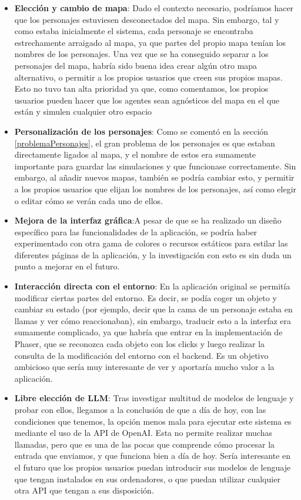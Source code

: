 \begin{itemize}
	\item \textbf{Elección y cambio de mapa}: Dado el contexto necesario, podríamos hacer que los personajes estuviesen desconectados del mapa. Sin embargo, tal y como estaba inicialmente el sistema, cada personaje se encontraba estrechamente arraigado al mapa, ya que partes del propio mapa tenían los nombres de los personajes. Una vez que se ha conseguido separar a los personajes del mapa, habría sido buena idea crear algún otro mapa alternativo, o permitir a los propios usuarios que creen sus propios mapas. Esto no tuvo tan alta prioridad ya que, como comentamos, los propios usuarios pueden hacer que los agentes sean agnósticos del mapa en el que están y simulen cualquier otro espacio
	
	\item \textbf{Personalización de los personajes}: Como se comentó en la sección \ref{problemaPersonajes}, el gran problema de los personajes es que estaban directamente ligados al mapa, y el nombre de estos era sumamente importante para guardar las simulaciones y que funcionase correctamente. Sin embargo, al añadir nuevos mapas, también se podría cambiar esto, y permitir a los propios usuarios que elijan los nombres de los personajes, así como elegir o editar cómo se verán cada uno de ellos.
	
	\item \textbf{Mejora de la interfaz gráfica}:A pesar de que se ha realizado un diseño específico para las funcionalidades de la aplicación, se podría haber experimentado con otra gama de colores o recursos estáticos para estilar las diferentes páginas de la aplicación, y la investigación con esto es sin duda un punto a mejorar en el futuro.
	
	\item \textbf{Interacción directa con el entorno}: En la aplicación original se permitía modificar ciertas partes del entorno. Es decir, se podía coger un objeto y cambiar su estado (por ejemplo, decir que la cama de un personaje estaba en llamas y ver cómo reaccionaban), sin embargo, traducir esto a la interfaz era sumamente complicado, ya que habría que entrar en la implementación de Phaser, que se reconozca cada objeto con los clicks y luego realizar la consulta de la modificación del entorno con el backend. Es un objetivo ambicioso que sería muy interesante de ver y aportaría mucho valor a la aplicación.
	
	\item \textbf{Libre elección de LLM}: Tras investigar multitud de modelos de lenguaje y probar con ellos, llegamos a la conclusión de que a día de hoy, con las condiciones que tenemos, la opción menos mala para ejecutar este sistema es mediante el uso de la API de OpenAI. Esta no permite realizar muchas llamadas, pero que es una de las pocas que comprende cómo procesar la entrada que enviamos, y que funciona bien a día de hoy. Sería interesante en el futuro que los propios usuarios puedan introducir sus modelos de lenguaje que tengan instalados en sus ordenadores, o que puedan utilizar cualquier otra API que tengan a sus disposición.
	

\end{itemize}
